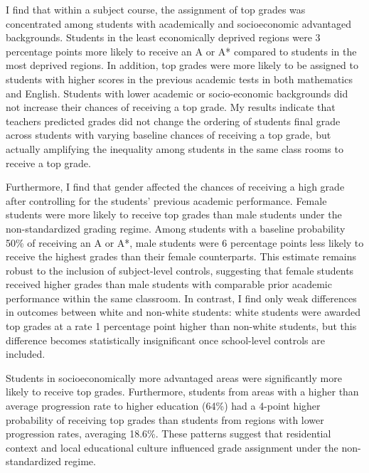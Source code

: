 \vspace{1em}

I find that within a subject course, the assignment of top grades was concentrated among students with academically and socioeconomic advantaged backgrounds. Students in the least economically deprived regions were 3 percentage points more likely to receive an A or A* compared to students in the most deprived regions. In addition, top grades were more likely to be assigned to students with higher scores in the previous academic tests in both mathematics and English. Students with lower academic or socio-economic backgrounds did not increase their chances of receiving a top grade. My results indicate that teachers predicted grades did not change the ordering of students final grade across students with varying baseline chances of receiving a top grade, but actually amplifying the inequality among students in the same class rooms to receive a top grade. 

Furthermore, I find that gender affected the chances of receiving a high grade after controlling for the students' previous academic performance. Female students were more likely to receive top grades than male students under the non-standardized grading regime. Among students with a baseline probability 50\% of receiving an A or A*, male students were 6 percentage points less likely to receive the highest grades than their female counterparts. This estimate remains robust to the inclusion of subject-level controls, suggesting that female students received higher grades than male students with comparable prior academic performance within the same classroom. In contrast, I find only weak differences in outcomes between white and non-white students: white students were awarded top grades at a rate 1 percentage point higher than non-white students, but this difference becomes statistically insignificant once school-level controls are included.

Students in socioeconomically more advantaged areas were significantly more likely to receive top grades. Furthermore, students from areas with a higher than average progression rate to higher education (64\%) had a 4-point higher probability of receiving top grades than students from regions with lower progression rates, averaging 18.6\%. These patterns suggest that residential context and local educational culture influenced grade assignment under the non-standardized regime.

